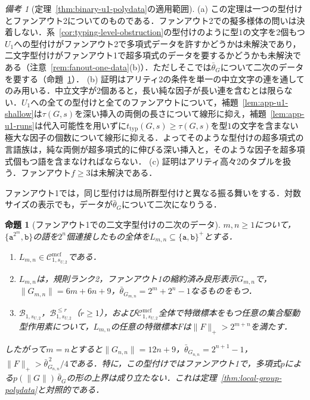\documentclass[11pt,a4paper]{ltjsarticle}
\numberwithin{equation}{section}
\theoremstyle{plain}
\newtheorem{proposition}[theorem]{命題}
\theoremstyle{definition}
\theoremstyle{remark}
\newtheorem{remark}[theorem]{備考}
\newcommand{\Cmcf}[2]{\mathcal{C}^{\mathrm{mcf}}_{#1,#2}}
\begin{document}
\begin{remark}[定理~\ref{thm:binary-u1-polydata}の適用範囲]
\label{rem:binary-u1-scope}
(a) この定理は一つの型付けとファンアウト2についてのものである．ファンアウト2での擬多様体の問いは決着しない．系~\ref{cor:typing-level-obstruction}の型付けのように型$1$の文字を2個もつ$U_1$への型付けがファンアウト2で多項式データを許すかどうかは未解決であり，二文字型付けがファンアウト1で超多項式のデータを要するかどうかも未解決である（注意~\ref{rem:fanout-one-data}(b)）．ただしそこでは$\bar\theta_G$について二次のデータを要する（命題~\ref{prop:binary-u1-quadratic}）．
(b) 証明はアリティ2の条件を単一の中立文字の連を通してのみ用いる．中立文字が2個あると，長い純な因子が長い連を含むとは限らない．$U_1$への全ての型付けと全てのファンアウトについて，補題~\ref{lem:app-u1-shallow}は$\tau(G,s)$を深い挿入の両側の長さについて線形に抑え，補題~\ref{lem:app-u1-runs}は代入可能性を用いずに$t_{\mathrm{typ}}(G,s)\ge\tau(G,s)$を型$1$の文字を含まない極大な因子の個数について線形に抑える．よってそのような型付けの超多項式の言語族は，純な両側が超多項式的に伸びる深い挿入と，そのような因子を超多項式個もつ語を含まなければならない．
(c) 証明はアリティ高々2のタプルを扱う．ファンアウト$f\ge3$は未解決である．
\end{remark}

ファンアウト1では，同じ型付けは局所群型付けと異なる振る舞いをする．対数サイズの表示でも，データが$\bar\theta_G$について二次になりうる．

\begin{proposition}[ファンアウト1での二文字型付けの二次のデータ]
\label{prop:binary-u1-quadratic}
$m,n\ge1$について，$\{\mathtt a^{2^m},\mathtt b\}$の語を$2^n$個連接したもの全体を$L_{m,n}\subseteq\{\mathtt a,\mathtt b\}^+$とする．
\begin{enumerate}[label=\textup{(\roman*)},leftmargin=*]
\item $L_{m,n}\in\Cmcf{1}{s_{U,2}}$である．
\item $L_{m,n}$は，規則ランク2，ファンアウト1の縮約済み良形表示$G_{m,n}$で，$\|G_{m,n}\|=6m+6n+9$，$\bar\theta_{G_{m,n}}=2^m+2^n-1$なるものをもつ．
\item $\mathcal B_{1,s_{U,2}}$，$\mathcal B^{\le r}_{1,s_{U,2}}$（$r\ge1$），および$\Cmcf{1}{s_{U,2}}$全体で特徴標本をもつ任意の集合駆動型作用素について，$L_{m,n}$の任意の特徴標本$F$は$\|F\|_+>2^{m+n}$を満たす．
\end{enumerate}
したがって$m=n$とすると$\|G_{n,n}\|=12n+9$，$\bar\theta_{G_{n,n}}=2^{n+1}-1$，$\|F\|_+>\bar\theta_{G_{n,n}}^{\,2}/4$である．特に，この型付けではファンアウト1で，多項式$p$による$p(\|G\|)\,\bar\theta_G$の形の上界は成り立たない．これは定理~\ref{thm:local-group-polydata}と対照的である．
\end{proposition}
\end{document}
